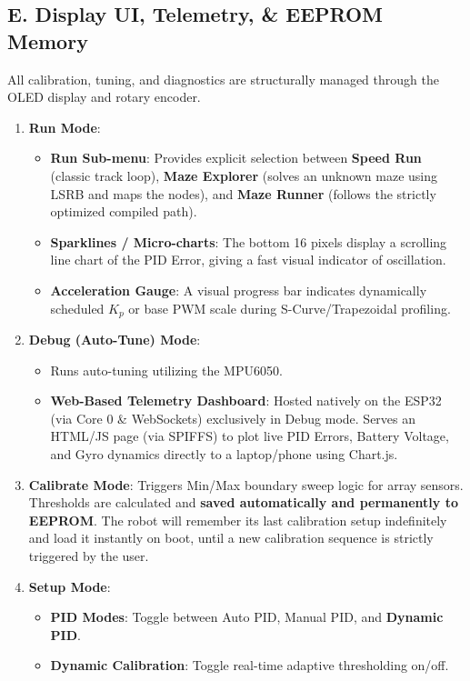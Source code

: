 \documentclass[12pt,a4paper]{article}
\begin{document}
\subsection*{E. Display UI, Telemetry, \& EEPROM Memory}
All calibration, tuning, and diagnostics are structurally managed through the OLED display and rotary encoder.
\begin{enumerate}
    \item \textbf{Run Mode}: 
    \begin{itemize}
        \item \textbf{Run Sub-menu}: Provides explicit selection between \textbf{Speed Run} (classic track loop), \textbf{Maze Explorer} (solves an unknown maze using LSRB and maps the nodes), and \textbf{Maze Runner} (follows the strictly optimized compiled path).
        \item \textbf{Sparklines / Micro-charts}: The bottom 16 pixels display a scrolling line chart of the PID Error, giving a fast visual indicator of oscillation.
        \item \textbf{Acceleration Gauge}: A visual progress bar indicates dynamically scheduled $K_p$ or base PWM scale during S-Curve/Trapezoidal profiling.
    \end{itemize}
    \item \textbf{Debug (Auto-Tune) Mode}:
    \begin{itemize}
        \item Runs auto-tuning utilizing the MPU6050.
        \item \textbf{Web-Based Telemetry Dashboard}: Hosted natively on the ESP32 (via Core 0 \& WebSockets) exclusively in Debug mode. Serves an HTML/JS page (via SPIFFS) to plot live PID Errors, Battery Voltage, and Gyro dynamics directly to a laptop/phone using Chart.js.
    \end{itemize}
    \item \textbf{Calibrate Mode}: Triggers Min/Max boundary sweep logic for array sensors. Thresholds are calculated and \textbf{saved automatically and permanently to EEPROM}. The robot will remember its last calibration setup indefinitely and load it instantly on boot, until a new calibration sequence is strictly triggered by the user.
    \item \textbf{Setup Mode}: 
    \begin{itemize}
        \item \textbf{PID Modes}: Toggle between Auto PID, Manual PID, and \textbf{Dynamic PID}.
        \item \textbf{Dynamic Calibration}: Toggle real-time adaptive thresholding on/off.

\end{itemize}
\end{enumerate}
\end{document}
